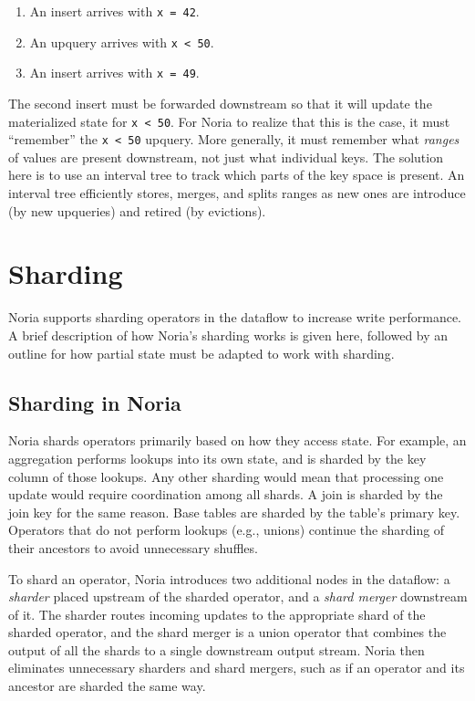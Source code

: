 \begin{enumerate}
  \item An insert arrives with \texttt{x = 42}.
  \item An upquery arrives with \texttt{x < 50}.
  \item An insert arrives with \texttt{x = 49}.
\end{enumerate}

The second insert must be forwarded downstream so that it will update the
materialized state for \texttt{x < 50}. For Noria to realize that this is the
case, it must ``remember'' the \texttt{x < 50} upquery. More generally, it must
remember what \emph{ranges} of values are present downstream, not just what
individual keys. The solution here is to use an interval tree to track which
parts of the key space is present. An interval tree efficiently stores, merges,
and splits ranges as new ones are introduce (by new upqueries) and retired (by
evictions).

\section{Sharding}

Noria supports sharding operators in the dataflow to increase write performance.
A brief description of how Noria's sharding works is given here, followed by an
outline for how partial state must be adapted to work with sharding.

\subsection{Sharding in Noria}

Noria shards operators primarily based on how they access state. For example, an
aggregation performs lookups into its own state, and is sharded by the key
column of those lookups. Any other sharding would mean that processing one
update would require coordination among all shards. A join is sharded by the
join key for the same reason. Base tables are sharded by the table's primary
key. Operators that do not perform lookups (e.g., unions) continue the sharding
of their ancestors to avoid unnecessary shuffles.

To shard an operator, Noria introduces two additional nodes in the dataflow: a
\emph{sharder} placed upstream of the sharded operator, and a \emph{shard
merger} downstream of it. The sharder routes incoming updates to the appropriate
shard of the sharded operator, and the shard merger is a union operator that
combines the output of all the shards to a single downstream output stream.
Noria then eliminates unnecessary sharders and shard mergers, such as if an
operator and its ancestor are sharded the same way.

